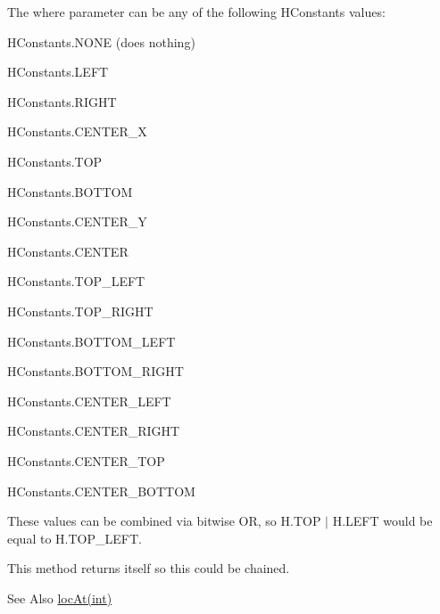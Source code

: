 The {\ttfamily where} parameter can be any of the following H\-Constants values\-:
\begin{DoxyItemize}
\item {\ttfamily H\-Constants.\-N\-O\-N\-E} (does nothing)
\item {\ttfamily H\-Constants.\-L\-E\-F\-T}
\item {\ttfamily H\-Constants.\-R\-I\-G\-H\-T}
\item {\ttfamily H\-Constants.\-C\-E\-N\-T\-E\-R\-\_\-\-X}
\item {\ttfamily H\-Constants.\-T\-O\-P}
\item {\ttfamily H\-Constants.\-B\-O\-T\-T\-O\-M}
\item {\ttfamily H\-Constants.\-C\-E\-N\-T\-E\-R\-\_\-\-Y}
\item {\ttfamily H\-Constants.\-C\-E\-N\-T\-E\-R}
\item {\ttfamily H\-Constants.\-T\-O\-P\-\_\-\-L\-E\-F\-T}
\item {\ttfamily H\-Constants.\-T\-O\-P\-\_\-\-R\-I\-G\-H\-T}
\item {\ttfamily H\-Constants.\-B\-O\-T\-T\-O\-M\-\_\-\-L\-E\-F\-T}
\item {\ttfamily H\-Constants.\-B\-O\-T\-T\-O\-M\-\_\-\-R\-I\-G\-H\-T}
\item {\ttfamily H\-Constants.\-C\-E\-N\-T\-E\-R\-\_\-\-L\-E\-F\-T}
\item {\ttfamily H\-Constants.\-C\-E\-N\-T\-E\-R\-\_\-\-R\-I\-G\-H\-T}
\item {\ttfamily H\-Constants.\-C\-E\-N\-T\-E\-R\-\_\-\-T\-O\-P}
\item {\ttfamily H\-Constants.\-C\-E\-N\-T\-E\-R\-\_\-\-B\-O\-T\-T\-O\-M}
\end{DoxyItemize}

These values can be combined via bitwise O\-R, so {\ttfamily H.\-T\-O\-P $|$ H.\-L\-E\-F\-T} would be equal to {\ttfamily H.\-T\-O\-P\-\_\-\-L\-E\-F\-T}.

This method returns itself so this could be chained. \begin{DoxySeeAlso}{See Also}
\hyperlink{classhype_1_1drawable_1_1_h_drawable_a0ca3d835df3317d50723404b777d3a65}{loc\-At(int)} 
\end{DoxySeeAlso}

